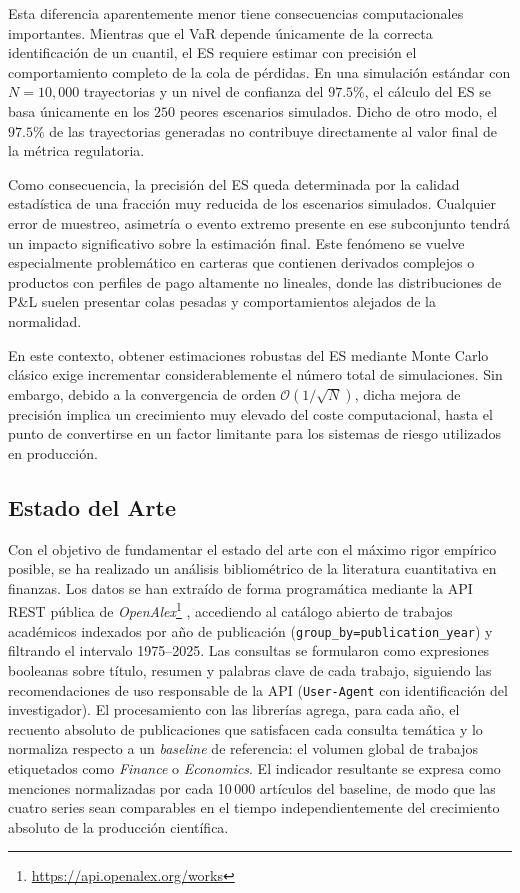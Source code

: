 \documentclass[11pt]{article}
\begin{document}
Esta diferencia aparentemente menor tiene consecuencias computacionales importantes. Mientras que el VaR depende únicamente de la correcta identificación de un cuantil, el ES requiere estimar con precisión el comportamiento completo de la cola de pérdidas. En una simulación estándar con $N = 10,000$ trayectorias y un nivel de confianza del $97.5\%$, el cálculo del ES se basa únicamente en los $250$ peores escenarios simulados. Dicho de otro modo, el $97.5\%$ de las trayectorias generadas no contribuye directamente al valor final de la métrica regulatoria.

Como consecuencia, la precisión del ES queda determinada por la calidad estadística de una fracción muy reducida de los escenarios simulados. Cualquier error de muestreo, asimetría o evento extremo presente en ese subconjunto tendrá un impacto significativo sobre la estimación final. Este fenómeno se vuelve especialmente problemático en carteras que contienen derivados complejos o productos con perfiles de pago altamente no lineales, donde las distribuciones de P\&L suelen presentar colas pesadas y comportamientos alejados de la normalidad.

En este contexto, obtener estimaciones robustas del ES mediante Monte Carlo clásico exige incrementar considerablemente el número total de simulaciones. Sin embargo, debido a la convergencia de orden $\mathcal{O}(1/\sqrt{N})$, dicha mejora de precisión implica un crecimiento muy elevado del coste computacional, hasta el punto de convertirse en un factor limitante para los sistemas de riesgo utilizados en producción.

\subsection{Estado del Arte}


Con el objetivo de fundamentar el estado del arte con el máximo rigor empírico posible, se ha realizado un análisis bibliométrico de la literatura cuantitativa en finanzas.
Los datos se han extraído de forma programática mediante la API REST pública de \textit{OpenAlex}\footnote{\url{https://api.openalex.org/works}} \cite{openalex2022}, accediendo al catálogo abierto de trabajos académicos indexados por año de publicación (\texttt{group\_by=publication\_year}) y filtrando el intervalo 1975--2025.
Las consultas se formularon como expresiones booleanas sobre título, resumen y palabras clave de cada trabajo, siguiendo las recomendaciones de uso responsable de la API (\texttt{User-Agent} con identificación del investigador).
El procesamiento con las librerías agrega, para cada año, el recuento absoluto de publicaciones que satisfacen cada consulta temática y lo normaliza respecto a un \emph{baseline} de referencia: el volumen global de trabajos etiquetados como \textit{Finance} o \textit{Economics}.
El indicador resultante se expresa como menciones normalizadas por cada 10\,000 artículos del baseline, de modo que las cuatro series sean comparables en el tiempo independientemente del crecimiento absoluto de la producción científica.
\end{document}
